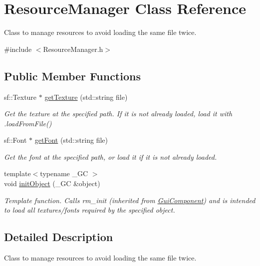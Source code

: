 \hypertarget{class_resource_manager}{}\section{Resource\+Manager Class Reference}
\label{class_resource_manager}


Class to manage resources to avoid loading the same file twice.  




{\ttfamily \#include $<$Resource\+Manager.\+h$>$}

\subsection*{Public Member Functions}
\begin{DoxyCompactItemize}
\item 
sf\+::\+Texture $\ast$ \mbox{\hyperlink{class_resource_manager_ad393b13cf5d0f81de842fb8bfc3ccb09}{get\+Texture}} (std\+::string file)
\begin{DoxyCompactList}\small\item\em Get the texture at the specified path. If it is not already loaded, load it with .load\+From\+File() \end{DoxyCompactList}\item 
sf\+::\+Font $\ast$ \mbox{\hyperlink{class_resource_manager_aa0b060cd409f3cfefc85b5fc3b17f5bb}{get\+Font}} (std\+::string file)
\begin{DoxyCompactList}\small\item\em Get the font at the specified path, or load it if it is not already loaded. \end{DoxyCompactList}\item 
{\footnotesize template$<$typename \+\_\+\+GC $>$ }\\void \mbox{\hyperlink{class_resource_manager_ad543c034d0cef8fd2f3e8f32b49ebb3f}{init\+Object}} (\+\_\+\+GC \&object)
\begin{DoxyCompactList}\small\item\em Template function. Calls rm\+\_\+init (inherited from \mbox{\hyperlink{class_gui_component}{Gui\+Component}}) and is intended to load all textures/fonts required by the specified object. \end{DoxyCompactList}\end{DoxyCompactItemize}


\subsection{Detailed Description}
Class to manage resources to avoid loading the same file twice. 

